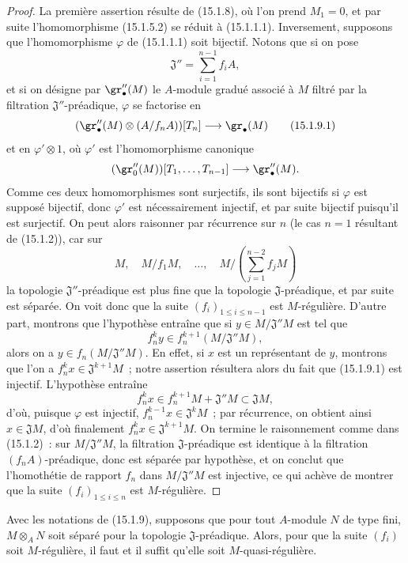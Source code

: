 \begin{proof}
La première assertion résulte de (15.1.8), où l'on prend $M_1=0$, et par suite
l'homomorphisme (15.1.5.2) se réduit à (15.1.1.1). Inversement, supposons que
l'homomorphisme $\varphi$ de (15.1.1.1) soit bijectif. Notons que si on pose
\[
  \mathfrak{J}''=\sum_{i=1}^{n-1}f_iA,
\]
et si on désigne par $\gr''_\bullet(M)$ le $A$-module gradué associé à $M$
filtré par la filtration $\mathfrak{J}''$-préadique, $\varphi$ se factorise en
\[
  (\gr''_\bullet(M)\otimes(A/f_nA))[T_n]\longrightarrow\gr_\bullet(M)
  \tag{15.1.9.1}\label{0.15.1.9.1-fr}
\]
et en $\varphi'\otimes1$, où $\varphi'$ est l'homomorphisme canonique
\[
  (\gr''_0(M))[T_1,\ldots,T_{n-1}]
  \longrightarrow\gr''_\bullet(M).
\]
Comme ces deux homomorphismes sont surjectifs, ils sont bijectifs si
$\varphi$ est supposé bijectif, donc $\varphi'$ est nécessairement injectif,
et par suite bijectif puisqu'il est surjectif. On peut alors raisonner par
récurrence sur $n$ (le cas $n=1$ résultant de (15.1.2)), car sur
\[
  M,\quad M/f_1M,\quad\ldots,\quad
  M/\left(\sum_{j=1}^{n-2}f_jM\right)
\]
la topologie $\mathfrak{J}''$-préadique est plus fine que la topologie
$\mathfrak{J}$-préadique, et par suite est séparée. On voit donc que la suite
$(f_i)_{1\leq i\leq n-1}$ est $M$-régulière. D'autre part, montrons que
l'hypothèse entraîne que si $y\in M/\mathfrak{J}''M$ est tel que
\[
  f_n^ky\in f_n^{k+1}(M/\mathfrak{J}''M),
\]
alors on a $y\in f_n(M/\mathfrak{J}''M)$. En effet, si $x$ est un représentant
de $y$, montrons que l'on a $f_n^kx\in\mathfrak{J}^{k+1}M$~; notre assertion
résultera alors du fait que (15.1.9.1) est injectif. L'hypothèse entraîne
\[
  f_n^kx\in f_n^{k+1}M+\mathfrak{J}''M\subset\mathfrak{J}M,
\]
d'où, puisque $\varphi$ est injectif,
$f_n^{k-1}x\in\mathfrak{J}^kM$~; par récurrence, on obtient ainsi
$x\in\mathfrak{J}M$, d'où finalement
$f_n^kx\in\mathfrak{J}^{k+1}M$. On termine le raisonnement comme dans
(15.1.2)~: sur $M/\mathfrak{J}''M$, la filtration
$\mathfrak{J}$-préadique est identique à la filtration
$(f_nA)$-préadique, donc est séparée par hypothèse, et on conclut que
l'homothétie de rapport $f_n$ dans $M/\mathfrak{J}''M$ est injective, ce qui
achève de montrer que la suite $(f_i)_{1\leq i\leq n}$ est $M$-régulière.
\end{proof}

\begin{corollary}[15.1.10]
\label{0.15.1.10-fr}
Avec les notations de (15.1.9), supposons que pour tout $A$-module $N$ de type
fini, $M\otimes_A N$ soit séparé pour la topologie
$\mathfrak{J}$-préadique. Alors, pour que la suite $(f_i)$ soit
$M$-régulière, il faut et il suffit qu'elle soit $M$-quasi-régulière.
\end{corollary}

